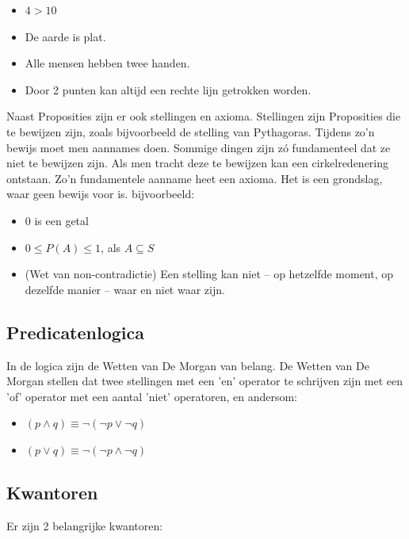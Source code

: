 \documentclass{article}
\begin{document}
		\begin{itemize}
			\item \( 4 > 10 \)
			\item De aarde is plat.
			\item Alle mensen hebben twee handen.
			\item Door 2 punten kan altijd een rechte lijn getrokken worden.
		\end{itemize}
		Naast Proposities zijn er ook stellingen en axioma. Stellingen zijn Proposities die te bewijzen zijn, zoals bijvoorbeeld de stelling van Pythagoras. Tijdens zo'n bewijs moet men aannames doen. Sommige dingen zijn zó fundamenteel dat ze niet te bewijzen zijn. Als men tracht deze te bewijzen kan een cirkelredenering ontstaan. Zo'n fundamentele aanname heet een axioma. Het is een grondslag, waar geen bewijs voor is. bijvoorbeeld:

		\begin{itemize}
			\item 0 is een getal
			\item \( 0 \leq P(A) \leq 1 \), als \( A \subseteq S \)
			\item (Wet van non-contradictie) Een stelling kan niet -- op hetzelfde moment, op dezelfde manier -- waar en niet waar zijn.
		\end{itemize}
		
		\subsection{Predicatenlogica}
		
		In de logica zijn de Wetten van De Morgan van belang. De Wetten van De Morgan stellen dat twee stellingen met een 'en' operator te schrijven zijn met een 'of' operator met een aantal 'niet' operatoren, en andersom:
	
		\begin{itemize}
			\item \( (p \land q) \equiv \neg(\neg p \lor \neg q) \)
			\item \( (p \lor q) \equiv \neg(\neg p \land \neg q) \)
		\end{itemize}
		
		\subsection{Kwantoren}
		
		Er zijn 2 belangrijke kwantoren:
\end{document}
